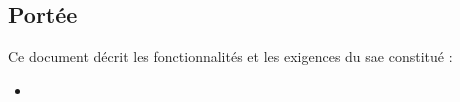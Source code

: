 \subsection{Portée} %

Ce document décrit les fonctionnalités et les exigences du \gls{sae} constitué :

\begin{itemize}
    \item \complete
\end{itemize}